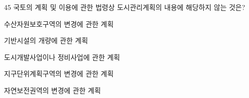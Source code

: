 \begin{question}{45}
국토의 계획 및 이용에 관한 법령상 도시관리계획의 내용에 해당하지 않는 것은?
\begin{choices}
  \item 수산자원보호구역의 변경에 관한 계획
  \item 기반시설의 개량에 관한 계획
  \item 도시개발사업이나 정비사업에 관한 계획
  \item 지구단위계획구역의 변경에 관한 계획
  \item 자연보전권역의 변경에 관한 계획
\end{choices}
\end{question}
